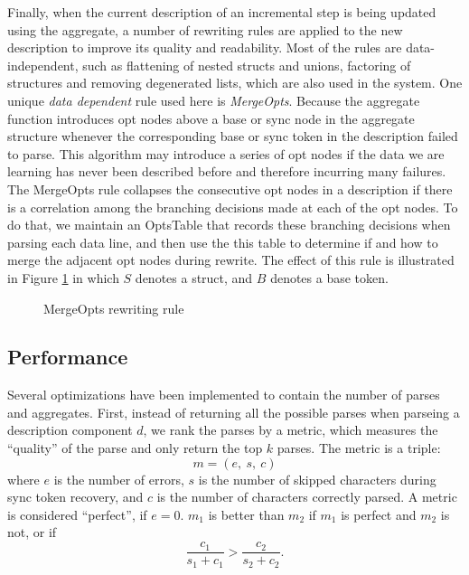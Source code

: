 Finally, when the current description of an incremental step is being updated
using the aggregate, a number of rewriting rules are applied to the new
description to improve its quality and readability. Most of the rules are
data-independent, such as flattening of nested structs and unions, factoring
of structures and removing degenerated lists, which are also used in the 
\learnpads{} system. One unique {\em data dependent} rule used here
is {\em MergeOpts}. Because the aggregate function
introduces opt nodes above a base or sync node in the aggregate structure
whenever the corresponding base or sync token in the description failed to 
parse. This algorithm may introduce a series of opt nodes if the data we
are learning has never been described before and therefore incurring many
failures. The MergeOpts rule collapses the consecutive opt nodes in a 
description if there is a correlation among the branching decisions made
at each of the opt nodes. To do that, we maintain an OptsTable that records
these branching decisions when parsing each data line, and then use the
this table to determine if and how to merge the adjacent opt nodes during
rewrite. The effect of this rule is illustrated in 
Figure \ref{fig:opts} in which
$S$ denotes a struct, and $B$ denotes a base token.

\begin{figure}[t]
\begin{center}
\caption{MergeOpts rewriting rule}\label{fig:opts}
\end{center}
\end{figure}


\subsection{Performance}
Several optimizations have been implemented to contain the number of
parses and aggregates. First, instead of returning all the possible
parses when parseing a description component $d$, 
we rank the parses by a metric, which
measures the ``quality'' of the parse and only return the top $k$
parses. The metric is a triple:
\[m = (e,~ s,~ c)\]
where $e$ is the number of errors, $s$ is the number of skipped
characters during sync token recovery, and $c$ is the number
of characters correctly parsed. A metric is considered ``perfect'', if $e = 0$.
$m_1$ is better than $m_2$ if $m_1$ is perfect and $m_2$ is not, or
if 
\[\frac{c_1}{s_1+c_1} > \frac{c_2}{s_2 + c_2}.\]


